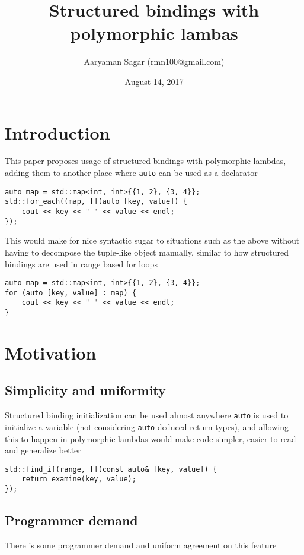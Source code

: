 \documentclass{article}
\begin{document}
\title{\textbf{Structured bindings with polymorphic lambas}}
\author{Aaryaman Sagar (rmn100@gmail.com)}
\date{August 14, 2017}
\maketitle

\section{Introduction}

This paper proposes usage of structured bindings with polymorphic lambdas,
adding them to another place where \texttt{auto} can be used as a declarator

\begin{lstlisting}
auto map = std::map<int, int>{{1, 2}, {3, 4}};
std::for_each((map, [](auto [key, value]) {
    cout << key << " " << value << endl;
});
\end{lstlisting}

This would make for nice syntactic sugar to situations such as the above
without having to decompose the tuple-like object manually, similar to how
structured bindings are used in range based for loops

\begin{lstlisting}
auto map = std::map<int, int>{{1, 2}, {3, 4}};
for (auto [key, value] : map) {
    cout << key << " " << value << endl;
}
\end{lstlisting}


\section{Motivation}

\subsection{Simplicity and uniformity}
Structured binding initialization can be used almost anywhere \texttt{auto} is
used to initialize a variable (not considering \texttt{auto} deduced return
types), and allowing this to happen in polymorphic lambdas would make code
simpler, easier to read and generalize better

\begin{lstlisting}
std::find_if(range, [](const auto& [key, value]) {
    return examine(key, value);
});
\end{lstlisting}

\subsection{Programmer demand}
There is some programmer demand and uniform agreement on this feature
\end{document}
